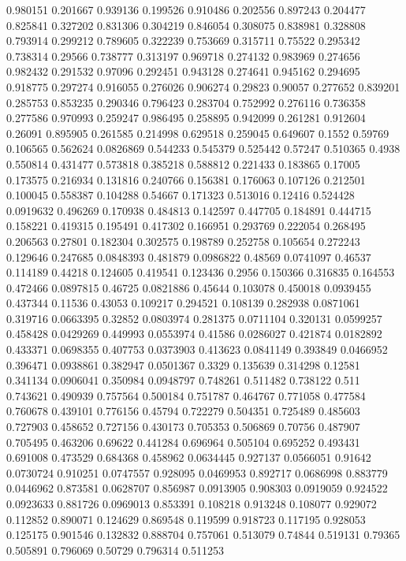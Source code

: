 0.980151 0.201667
0.939136 0.199526
0.910486 0.202556
0.897243 0.204477
0.825841 0.327202
0.831306 0.304219
0.846054 0.308075
0.838981 0.328808
0.793914 0.299212
0.789605 0.322239
0.753669 0.315711
0.75522 0.295342
0.738314 0.29566
0.738777 0.313197
0.969718 0.274132
0.983969 0.274656
0.982432 0.291532
0.97096 0.292451
0.943128 0.274641
0.945162 0.294695
0.918775 0.297274
0.916055 0.276026
0.906274 0.29823
0.90057 0.277652
0.839201 0.285753
0.853235 0.290346
0.796423 0.283704
0.752992 0.276116
0.736358 0.277586
0.970993 0.259247
0.986495 0.258895
0.942099 0.261281
0.912604 0.26091
0.895905 0.261585
0.214998 0.629518
0.259045 0.649607
0.1552 0.59769
0.106565 0.562624
0.0826869 0.544233
0.545379 0.525442
0.57247 0.510365
0.4938 0.550814
0.431477 0.573818
0.385218 0.588812
0.221433 0.183865
0.17005 0.173575
0.216934 0.131816
0.240766 0.156381
0.176063 0.107126
0.212501 0.100045
0.558387 0.104288
0.54667 0.171323
0.513016 0.12416
0.524428 0.0919632
0.496269 0.170938
0.484813 0.142597
0.447705 0.184891
0.444715 0.158221
0.419315 0.195491
0.417302 0.166951
0.293769 0.222054
0.268495 0.206563
0.27801 0.182304
0.302575 0.198789
0.252758 0.105654
0.272243 0.129646
0.247685 0.0848393
0.481879 0.0986822
0.48569 0.0741097
0.46537 0.114189
0.44218 0.124605
0.419541 0.123436
0.2956 0.150366
0.316835 0.164553
0.472466 0.0897815
0.46725 0.0821886
0.45644 0.103078
0.450018 0.0939455
0.437344 0.11536
0.43053 0.109217
0.294521 0.108139
0.282938 0.0871061
0.319716 0.0663395
0.32852 0.0803974
0.281375 0.0711104
0.320131 0.0599257
0.458428 0.0429269
0.449993 0.0553974
0.41586 0.0286027
0.421874 0.0182892
0.433371 0.0698355
0.407753 0.0373903
0.413623 0.0841149
0.393849 0.0466952
0.396471 0.0938861
0.382947 0.0501367
0.3329 0.135639
0.314298 0.12581
0.341134 0.0906041
0.350984 0.0948797
0.748261 0.511482
0.738122 0.511
0.743621 0.490939
0.757564 0.500184
0.751787 0.464767
0.771058 0.477584
0.760678 0.439101
0.776156 0.45794
0.722279 0.504351
0.725489 0.485603
0.727903 0.458652
0.727156 0.430173
0.705353 0.506869
0.70756 0.487907
0.705495 0.463206
0.69622 0.441284
0.696964 0.505104
0.695252 0.493431
0.691008 0.473529
0.684368 0.458962
0.0634445 0.927137
0.0566051 0.91642
0.0730724 0.910251
0.0747557 0.928095
0.0469953 0.892717
0.0686998 0.883779
0.0446962 0.873581
0.0628707 0.856987
0.0913905 0.908303
0.0919059 0.924522
0.0923633 0.881726
0.0969013 0.853391
0.108218 0.913248
0.108077 0.929072
0.112852 0.890071
0.124629 0.869548
0.119599 0.918723
0.117195 0.928053
0.125175 0.901546
0.132832 0.888704
0.757061 0.513079
0.74844 0.519131
0.79365 0.505891
0.796069 0.50729
0.796314 0.511253
